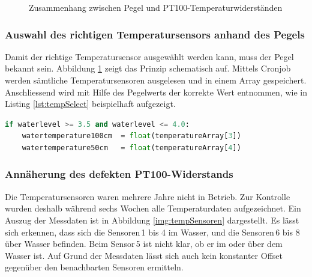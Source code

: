 \begin{figure}[htbp]
	\centering
	\caption{Zusammenhang zwischen Pegel und PT100-Temperaturwiderständen}
	\label{img:wassertempsensoren}
\end{figure}

\subsubsection{Auswahl des richtigen Temperatursensors anhand des Pegels}
Damit der richtige Temperatursensor ausgewählt werden kann, muss der Pegel bekannt sein. Abbildung \ref{img:wassertempsensoren} zeigt das Prinzip schematisch auf. Mittels Cronjob werden sämtliche Temperatursensoren ausgelesen und in einem Array gespeichert. Anschliessend wird mit Hilfe des Pegelwerts der korrekte Wert entnommen, wie in Listing \ref{lst:tempSelect} beispielhaft aufgezeigt.

\begin{lstlisting}[label=lst:tempSelect,caption=Auswahl des richtigen Temperatursensors, language=Python, style=py]
if waterlevel >= 3.5 and waterlevel <= 4.0:
    watertemperature100cm  = float(temperatureArray[3])
    watertemperature50cm   = float(temperatureArray[4])
\end{lstlisting}




\subsubsection{Annäherung des defekten PT100-Widerstands}
Die Temperatursensoren waren mehrere Jahre nicht in Betrieb. Zur Kontrolle wurden deshalb während sechs Wochen alle Temperaturdaten aufgezeichnet. Ein Auszug der Messdaten ist in Abbildung \ref{img:tempSensoren} dargestellt. Es lässt sich erkennen, dass sich die Sensoren\,1 bis 4 im Wasser, und die Sensoren\,6 bis 8 über Wasser befinden. Beim Sensor\,5 ist nicht klar, ob er im oder über dem Wasser ist. Auf Grund der Messdaten lässt sich auch kein konstanter Offset gegenüber den benachbarten Sensoren ermitteln.

